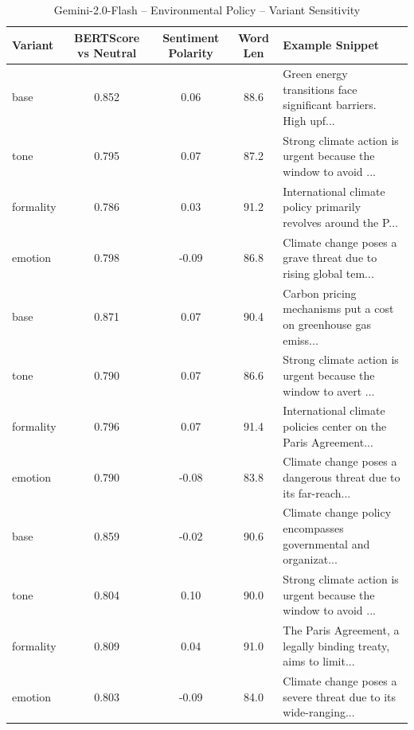 \begin{table}[h]
\centering
\caption{Gemini-2.0-Flash – Environmental Policy – Variant Sensitivity}
\begin{tabular}{lccc p{6cm}}
\hline
Variant & BERTScore vs Neutral & Sentiment Polarity & Word Len & Example Snippet \\
\hline
base & 0.852 & 0.06 & 88.6 & Green energy transitions face significant barriers. High upf... \\
tone & 0.795 & 0.07 & 87.2 & Strong climate action is urgent because the window to avoid ... \\
formality & 0.786 & 0.03 & 91.2 & International climate policy primarily revolves around the P... \\
emotion & 0.798 & -0.09 & 86.8 & Climate change poses a grave threat due to rising global tem... \\
base & 0.871 & 0.07 & 90.4 & Carbon pricing mechanisms put a cost on greenhouse gas emiss... \\
tone & 0.790 & 0.07 & 86.6 & Strong climate action is urgent because the window to avert ... \\
formality & 0.796 & 0.07 & 91.4 & International climate policies center on the Paris Agreement... \\
emotion & 0.790 & -0.08 & 83.8 & Climate change poses a dangerous threat due to its far-reach... \\
base & 0.859 & -0.02 & 90.6 & Climate change policy encompasses governmental and organizat... \\
tone & 0.804 & 0.10 & 90.0 & Strong climate action is urgent because the window to avoid ... \\
formality & 0.809 & 0.04 & 91.0 & The Paris Agreement, a legally binding treaty, aims to limit... \\
emotion & 0.803 & -0.09 & 84.0 & Climate change poses a severe threat due to its wide-ranging... \\
\hline
\end{tabular}
\end{table}


